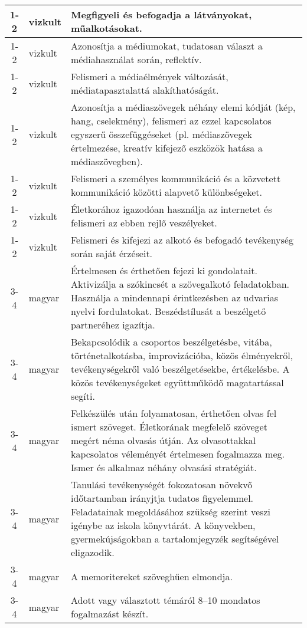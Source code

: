 \begin{small}
\begin{longtable}{c | p{2cm} |  p{11cm} }
              1-2 & vizkult & Megfigyeli és befogadja a látványokat, műalkotásokat. \\ \hline
              1-2 & vizkult & Azonosítja a médiumokat, tudatosan választ a médiahasználat során, reflektív. \\ \hline
              1-2 & vizkult & Felismeri a médiaélmények változását, médiatapasztalattá alakíthatóságát. \\ \hline
              1-2 & vizkult & Azonosítja a médiaszövegek néhány elemi kódját (kép, hang, cselekmény), felismeri az ezzel kapcsolatos egyszerű összefüggéseket (pl. médiaszövegek értelmezése, kreatív kifejező eszközök hatása a médiaszövegben). \\ \hline
              1-2 & vizkult & Felismeri a személyes kommunikáció és a közvetett kommunikáció közötti alapvető különbségeket. \\ \hline
              1-2 & vizkult & Életkorához igazodóan használja az internetet és felismeri az ebben rejlő veszélyeket. \\ \hline
              1-2 & vizkult & Felismeri és kifejezi az alkotó és befogadó tevékenység során saját érzéseit. \\ \hline
              3-4 & magyar & Értelmesen és érthetően fejezi ki gondolatait. Aktivizálja a szókincsét a szövegalkotó feladatokban. Használja a mindennapi érintkezésben az udvarias nyelvi fordulatokat. Beszédstílusát a beszélgető partneréhez igazítja. \\ \hline
              3-4 & magyar & Bekapcsolódik a csoportos beszélgetésbe, vitába, történetalkotásba, improvizációba, közös élményekről, tevékenységekről való beszélgetésekbe, értékelésbe. A közös tevékenységeket együttműködő magatartással segíti. \\ \hline
              3-4 & magyar & Felkészülés után folyamatosan, érthetően olvas fel ismert szöveget. Életkorának megfelelő szöveget megért néma olvasás útján. Az olvasottakkal kapcsolatos véleményét értelmesen fogalmazza meg. Ismer és alkalmaz néhány olvasási stratégiát. \\ \hline
              3-4 & magyar & Tanulási tevékenységét fokozatosan növekvő időtartamban irányjtja tudatos figyelemmel. Feladatainak megoldásához szükség szerint veszi igénybe az iskola könyvtárát. A könyvekben, gyermekújságokban a tartalomjegyzék segítségével eligazodik. \\ \hline
              3-4 & magyar & A memoritereket szöveghűen elmondja. \\ \hline
              3-4 & magyar & Adott vagy választott témáról 8–10 mondatos fogalmazást készít. \\ \hline

\end{longtable}
\end{small}

